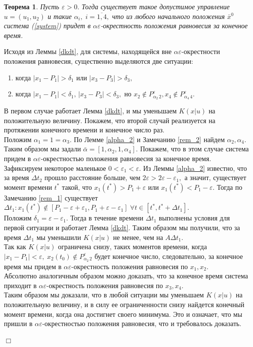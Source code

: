 \documentclass[11pt]{article}
\newtheorem{theorem}{Теорема}
\theoremstyle{definition}
\newenvironment{Proof}
{\par\noindent{\bf Доказательство.\\}} 
{\begin{flushright}$\Box$\end{flushright}}
\newcommand\Ref[1]{(\ref{#1})}
\newcommand\RS{\Ref{system} }
\begin{document}
\begin{theorem} 
	Пусть $\varepsilon > 0.$ Тогда существует такое допустимое управление $u = (u_1, u_2)$ и такие $\alpha_i,\; i = \overline{1,4},$ что из любого начального положения $\bar x^0$ система \RS придет в $\alpha\varepsilon$-окрестность положения равновесия за конечное время.
\end{theorem}
\begin{Proof}
	Исходя из Леммы \ref{dkdt}, для системы, находящейся вне $\alpha\varepsilon$-окрестности положения равновесия, существенно выделяются две ситуации:
	\begin{enumerate}
		\item когда $|x_1 - P_1| > \delta_1$ или $|x_3 - P_3| > \delta_3,$
		\item когда $|x_1 - P_1| < \delta_1, \, |x_3 - P_3| < \delta_3,$ но $x_2 \not \in P_{\alpha_2 \,2}^{\varepsilon}, x_4 \not \in P_{\alpha_4 \,4}^{\varepsilon}.$
	\end{enumerate}
	В первом случае работает Лемма \ref{dkdt}, и мы уменьшаем $K(x|u)$ на положительную величину. Покажем, что второй случай реализуется на протяжении конечного времени и конечное число раз.\\
	Положим $\alpha_1 = 1 = \alpha_3.$ По Лемме \ref{alpha_2} и Замечанию \ref{rem_2} найдем $\alpha_2, \alpha_4.$ Таким образом мы задали $\bar \alpha = [1,\alpha_2,1,\alpha_4].$ Покажем, что в этом случае система придем в $\alpha\varepsilon$-окрестностью положения равновесия за конечное время.\\
	Зафиксируем некоторое маленькое $0 < \varepsilon_1 < \varepsilon.$ Из Леммы \ref{alpha_2} известно, что за время $\Delta t_2$ прошло расстояние больше, чем $2\varepsilon > 2\varepsilon - \varepsilon_1,$ а значит, существует момент времени $t^*$ такой, что $x_1(t^*) > P_1 + \varepsilon$ или $x_1(t^*) < P_1 - \varepsilon.$ Тогда по Замечанию \ref{rem_1} существует $\Delta t_1 : x_1(t^*) \not \in [P_1 - \varepsilon + \varepsilon_1, P_1 + \varepsilon - \varepsilon_1] \; \forall t \in [t^*, t^* + \Delta t_1].$ \\
	Положим $\delta_1 = \varepsilon - \varepsilon_1.$ Тогда в течение времени $\Delta t_1$ выполнены условия для первой ситуации и работает Лемма \ref{dkdt}. Таким образом мы получили, что за время $\Delta t_1$ мы уменьшили $K(x|u)$ не менее, чем на $A\Delta t_1.$ \\
	Так как $K(x|u)$ ограничена снизу, таких моментов времени, когда $|x_1 - P_1| < \varepsilon, \; x_2(t_0) \not \in P_{\alpha_2 \, 2}^{\varepsilon}$ будет конечное число, следовательно, за конечное время мы придем в $\alpha\varepsilon$-окрестность положения равновесия по $x_1, x_2.$ \\
	Абсолютно аналогичным образом можно доказать, что за конечное время система приходит в $\alpha\varepsilon$-окрестность положения равновесия по $x_3, x_4.$\\
	Таким образом мы доказали, что в любой ситуации мы уменьшаем $K(x|u)$ на положительную величину, и в силу ее ограниченности снизу найдется конечный момент времени, когда она достигнет своего минимума. Это и означает, что мы пришли в $\alpha\varepsilon$-окрестностью положения равновесия, что и требовалось доказать.
\end{Proof}
\end{document}
